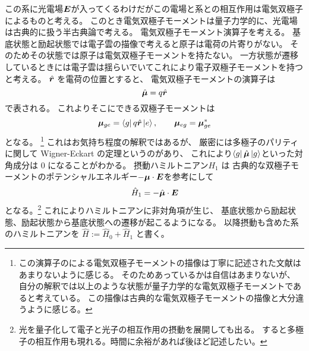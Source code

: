 \documentclass[11pt,dvipdfmx,a4paper]{jsarticle}
\begin{document}
この系に光電場\(\vb*{E}\)が入ってくるわけだがこの電場と系との相互作用は電気双極子によるものと考える。
このとき電気双極子モーメントは量子力学的に、光電場は古典的に扱う半古典論で考える。
電気双極子モーメント演算子を考える。
基底状態と励起状態では電子雲の描像で考えると原子は電荷の片寄りがない。
そのためその状態では原子は電気双極子モーメントを持たない。
一方状態が遷移しているときには電子雲は揺らいでいてこれにより電子双極子モーメントを持つと考える。
\(\hat{\vb*{r}}\) を電荷の位置とすると、
電気双極子モーメントの演算子は
\begin{equation}
	\hat{\vb*{\mu}} = q \hat{\vb*{r}}
\end{equation}
で表される。
これよりそこにできる双極子モーメントは
\begin{equation}
	\vb*{\mu}_{ge} = \bra{g}q\hat{\vb*{r}}\ket{e},\qquad \vb*{\mu}_{eg} = \vb*{\mu}_{ge}^{*}
\end{equation}
となる。
\footnote{この演算子のによる電気双極子モーメントの描像は丁寧に記述された文献はあまりないように感じる。
そのためあっているかは自信はあまりないが、
自分の解釈では以上のような状態が量子力学的な電気双極子モーメントであると考えている。
この描像は古典的な電気双極子モーメントの描像と大分違うように感じる。}
これはお気持ち程度の解釈ではあるが、
厳密には多極子のパリティに関して Wigner-Eckart の定理というのがあり、
これにより\(\bra{g}\hat{\vb*{\mu}}\ket{g}\)といった対角成分は \(0\) になることがわかる。
摂動ハミルトニアン\(H_1\) は
古典的な双極子モーメントのポテンシャルエネルギー\(-\vb*{\mu}\cdot\vb*{E}\)を参考にして
\begin{equation}
	\hat{H}_1 = - \hat{\vb*{\mu}}\cdot\vb*{E}
\end{equation}
となる。\footnote{光を量子化して電子と光子の相互作用の摂動を展開しても出る。
すると多極子の相互作用も現れる。時間に余裕があれば後ほど記述したい。}
これによりハミルトニアンに非対角項が生じ、
基底状態から励起状態、励起状態から基底状態への遷移が起こるようになる。
以降摂動も含めた系のハミルトニアンを \(\hat{H} := \hat{H}_0 + \hat{H}_1\) と書く。
\end{document}
